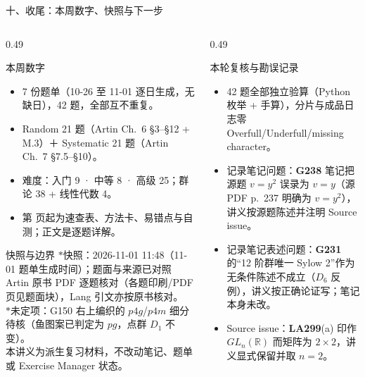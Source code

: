 \documentclass[aspectratio=169,10pt,fontset=none]{ctexbeamer}
\newcommand{\ex}[1]{\textcolor{accent}{\footnotesize\bfseries #1}}
\newcommand{\starpt}{\textcolor{accent}{\bfseries$\ast$}}
\begin{document}
\begin{frame}[t]{十、收尾：本周数字、快照与下一步}
  \label{sec:wrap}
  \begin{columns}[T,onlytextwidth]
    \begin{column}{0.49\textwidth}
      \begin{block}{\footnotesize 本周数字}
        \scriptsize
        \begin{itemize}\setlength{\itemsep}{1pt}
          \item 7 份题单（10-26 至 11-01 逐日生成，无缺日），42 题，全部互不重复。
          \item Random 21 题（Artin Ch.~6 \S3--\S12 + M.3）＋ Systematic 21 题（Artin Ch.~7 \S7.5--\S10）。
          \item 难度：入门 9 · 中等 8 · 高级 25；群论 38 + 线性代数 4。
          \item 第 \pageref{sec:answers} 页起为速查表、方法卡、易错点与自测；正文是逐题详解。
        \end{itemize}
      \end{block}
      \begin{block}{\footnotesize 快照与边界}
        \scriptsize
        \starpt 快照：2026-11-01 11:48（11-01 题单生成时间）；题面与来源已对照 Artin 原书 PDF 逐题核对（各题印刷/PDF 页见题面块），Lang 引文亦按原书核对。\\
        \starpt 未定项：G150 右上编织的 $p4g$/$p4m$ 细分待核（鱼图案已判定为 $pg$，点群 $D_1$ 不变）。\\
        本讲义为派生复习材料，不改动笔记、题单或 Exercise Manager 状态。
      \end{block}
    \end{column}
    \begin{column}{0.49\textwidth}
      \begin{block}{\footnotesize 本轮复核与勘误记录}
        \scriptsize
        \begin{itemize}\setlength{\itemsep}{1pt}
          \item 42 题全部独立验算（Python 枚举 + 手算），分片与成品日志零 Overfull/Underfull/missing character。
          \item 记录笔记问题：\ex{G238} 笔记把源题 $v=y^2$ 误录为 $v=y$（源 PDF p.~237 明确为 $v=y^2$），讲义按源题陈述并注明 Source issue。
          \item 记录笔记表述问题：\ex{G231} 的“12 阶群唯一 Sylow 2”作为无条件陈述不成立（$D_6$ 反例），讲义按正确论证写；笔记本身未改。
          \item Source issue：\ex{LA299}(a) 印作 $GL_n(\mathbb R)$ 而矩阵为 $2\times2$，讲义显式保留并取 $n=2$。

\end{itemize}
\end{block}
\end{column}
\end{columns}
\end{frame}
\end{document}
